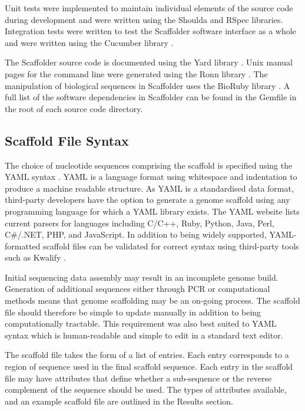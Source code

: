 \documentclass[10pt]{bmc_article}
\newenvironment{bmcformat}{\begin{raggedright}\baselineskip20pt\sloppy\setboolean{publ}{false}}{\end{raggedright}\baselineskip20pt\sloppy}
\begin{document}
\begin{bmcformat}
Unit tests were implemented to maintain individual elements of the source code
during development and were written using the Shoulda and RSpec \cite{rspec}
libraries. Integration tests were written to test the Scaffolder software
interface as a whole and were written using the Cucumber library \cite{rspec}.
\pb

The Scaffolder source code is documented using the Yard library \cite{yard}.
Unix manual pages for the command line were generated using the Ronn library
\cite{ronn}. The manipulation of biological sequences in Scaffolder uses the
BioRuby library \cite{goto2010}. A full list of the software dependencies in
Scaffolder can be found in the Gemfile in the root of each source code
directory. \pb

\subsection*{Scaffold File Syntax} %

The choice of nucleotide sequences comprising the scaffold is specified using
the YAML syntax \cite{yaml}. YAML is a language format using whitespace and
indentation to produce a machine readable structure. As YAML is a standardised
data format, third-party developers have the option to generate a genome
scaffold using any programming language for which a YAML library exists. The
YAML website lists current parsers for languages including C/C++, Ruby, Python,
Java, Perl, C\#/.NET, PHP, and JavaScript. In addition to being widely
supported, YAML-formatted scaffold files can be validated for correct syntax
using third-party tools such as Kwalify \cite{kwalify}. \pb

Initial sequencing data assembly may result in an incomplete genome build.
Generation of additional sequences either through PCR or computational methods
means that genome scaffolding may be an on-going process. The scaffold file
should therefore be simple to update manually in addition to being
computationally tractable. This requirement was also best suited to YAML
syntax which is human-readable and simple to edit in a standard text editor.
\pb

The scaffold file takes the form of a list of entries. Each entry corresponds
to a region of sequence used in the final scaffold sequence. Each entry in the
scaffold file may have attributes that define whether a sub-sequence or the
reverse complement of the sequence should be used. The types of attributes
available, and an example scaffold file are outlined in the Results section.
\pb


\end{bmcformat}
\end{document}
